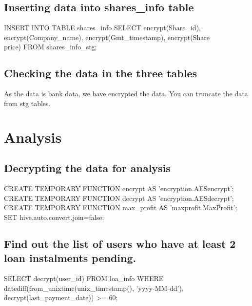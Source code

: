 \subsection{Inserting data into shares\_info table}
INSERT INTO TABLE shares\_info \newline
SELECT encrypt(Share\_id), \newline
encrypt(Company\_name), \newline
encrypt(Gmt\_timestamp), \newline
encrypt(Share\\price) \newline
FROM shares\_info\_stg; \newline

\subsection{Checking the data in the three tables}
As the data is bank data, we have encrypted the data.\newline
You can truncate the data from stg tables.\newline

\section{Analysis}
\subsection{Decrypting the data for analysis}
CREATE TEMPORARY FUNCTION encrypt AS 'encryption.AESencrypt';\newline
CREATE TEMPORARY FUNCTION decrypt AS 'encryption.AESdecrypt';\newline
CREATE TEMPORARY FUNCTION max\_profit AS 'maxprofit.MaxProfit';\newline
SET hive.auto.convert.join=false;\newline

\subsection{Find out the list of users who have at least 2 loan instalments pending.}
SELECT decrypt(user\_id) \newline
FROM loa\_info \newline
WHERE datediff(from\_unixtime(unix\_timestamp(), 'yyyy-MM-dd'), \newline
decrypt(last\_payment\_date)) >= 60; \newline

